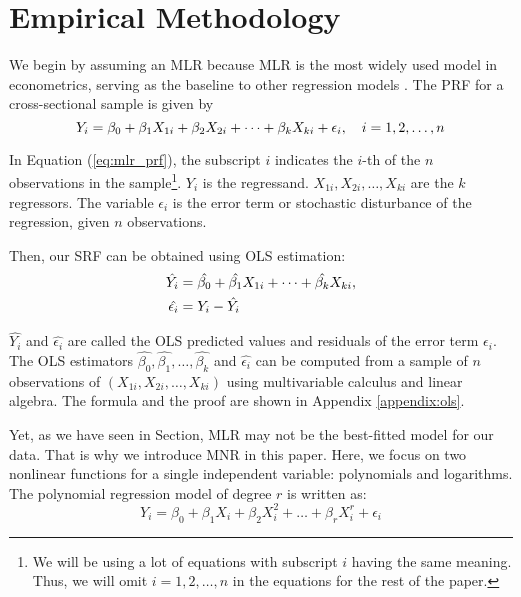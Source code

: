 \section{Empirical Methodology}
\label{sec:em}

We begin by assuming an \acs{MLR} because \acs{MLR} is the most widely used model in econometrics, serving as the baseline to other regression models \cite{christopher_2006, wooldridge_2020}. The \acs{PRF} for a cross-sectional sample is given by
\begin{equation}\label{eq:mlr_prf}
{Y_{i}}=\beta_{0}+\beta_{1}{X_{1i}}+\beta_{2}X_{2i}+\dots+\beta_{k}X_{ki}+\epsilon_{i},\quad i=1,2,\dots,n
\end{equation}

In Equation (\ref{eq:mlr_prf}), the subscript $i$ indicates the $i$-th of the $n$ observations in the sample\footnote{We will be using a lot of equations with subscript $i$ having the same meaning. Thus, we will omit $i=1,2,\dots,n$ in the equations for the rest of the paper.}. $Y_{i}$ is the regressand. $X_{1i}, X_{2i},\dots, X_{ki}$ are the $k$ regressors. The variable $\epsilon_{i}$ is the error term or stochastic disturbance of the regression, given $n$ observations.

Then, our \acs{SRF} can be obtained using \acs{OLS} estimation:
\begin{equation}\label{eq:mlr_srf}
\begin{aligned}
\hat{Y_{i}}&=\hat{\beta_{0}}+\hat{\beta_{1}}X_{1i}+\dots+\hat{\beta_{k}}X_{ki},
\\
\hat{\epsilon_{i}}&=Y_{i}-\hat{Y_{i}}
\end{aligned}
\end{equation} 


$\hat{Y_{i}}$ and $\hat{\epsilon_{i}}$ are called the \acs{OLS} predicted values and residuals of the error term $\epsilon_{i}$. The \acs{OLS} estimators $\hat{\beta_{0}},\hat{\beta_{1}},\dots,\hat{\beta_{k}}$ and $\hat{\epsilon_{i}}$ can be computed from a sample of $n$ observations of $(X_{1i},X_{2i},\dots,X_{ki})$ using multivariable calculus and linear algebra. The formula and the proof are shown in Appendix \ref{appendix:ols}. 

Yet, as we have seen in \hyperref[sec:data]{} Section, \acs{MLR} may not be the best-fitted model for our data. That is why we introduce \acs{MNR} in this paper. Here, we focus on two nonlinear functions for a single independent variable: polynomials and logarithms.
The polynomial regression model of degree $r$ is written as:
\begin{equation}\label{eq:mlr_polynomial}
{Y_{i}}=\beta_{0}+\beta_{1}{X_{i}}+\beta_{2}X_{i}^2+\dots+\beta_{r}X_{i}^r+\epsilon_{i}
\end{equation}

